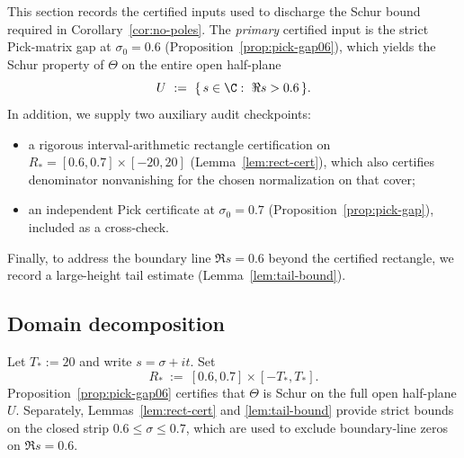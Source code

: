 \documentclass[11pt]{article}
\begin{document}
This section records the certified inputs used to discharge the Schur bound required in Corollary~\ref{cor:no-poles}.
The \emph{primary} certified input is the strict Pick-matrix gap at $\sigma_0=0.6$ (Proposition~\ref{prop:pick-gap06}), which yields the Schur property of $\Theta$ on the entire open half-plane
\[
  U\ :=\ \{\,s\in\C:\ \Re s>0.6\,\}.
\]
In addition, we supply two auxiliary audit checkpoints:
\begin{itemize}
\item a rigorous interval-arithmetic rectangle certification on $R_\ast=[0.6,0.7]\times[-20,20]$ (Lemma~\ref{lem:rect-cert}), which also certifies denominator nonvanishing for the chosen normalization on that cover;
\item an independent Pick certificate at $\sigma_0=0.7$ (Proposition~\ref{prop:pick-gap}), included as a cross-check.
\end{itemize}
Finally, to address the boundary line $\Re s=0.6$ beyond the certified rectangle, we record a large-height tail estimate (Lemma~\ref{lem:tail-bound}).

\subsection*{Domain decomposition}
Let $T_\ast:=20$ and write $s=\sigma+it$.
Set
\[
  R_\ast\ :=\ [0.6,0.7]\times[-T_\ast,T_\ast].
\]
Proposition~\ref{prop:pick-gap06} certifies that $\Theta$ is Schur on the full open half-plane $U$.
Separately, Lemmas~\ref{lem:rect-cert} and \ref{lem:tail-bound} provide strict bounds on the closed strip $0.6\le \sigma\le 0.7$, which are used to exclude boundary-line zeros on $\Re s=0.6$.
\end{document}
